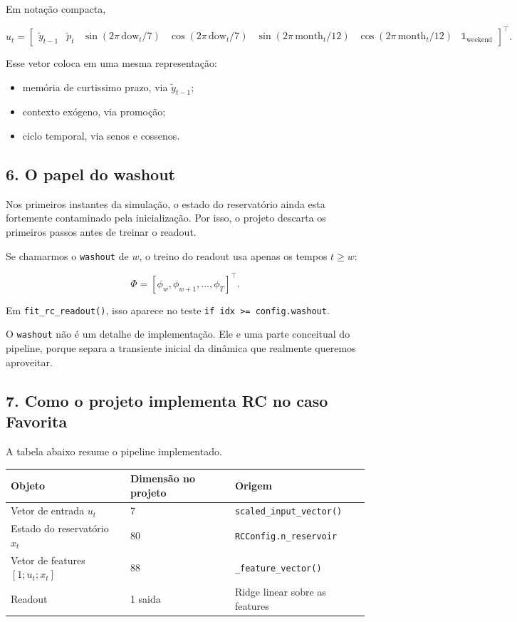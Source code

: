 \documentclass[12pt]{article}
\providecommand{\tightlist}{%
  \setlength{\itemsep}{0pt}\setlength{\parskip}{0pt}}
\begin{document}
Em notação compacta,

\[
u_t =
\begin{bmatrix}
\widetilde{y}_{t-1} &
\widetilde{p}_t &
\sin(2\pi \, \mathrm{dow}_t / 7) &
\cos(2\pi \, \mathrm{dow}_t / 7) &
\sin(2\pi \, \mathrm{month}_t / 12) &
\cos(2\pi \, \mathrm{month}_t / 12) &
\mathbb{1}_{\mathrm{weekend}}
\end{bmatrix}^\top.
\]

Esse vetor coloca em uma mesma representação:

\begin{itemize}
\tightlist
\item
  memória de curtissimo prazo, via \(\widetilde{y}_{t-1}\);
\item
  contexto exógeno, via promoção;
\item
  ciclo temporal, via senos e cossenos.
\end{itemize}

\subsection{6. O papel do washout}\label{6-o-papel-do-washout}

Nos primeiros instantes da simulação, o estado do reservatório ainda esta fortemente contaminado pela inicialização. Por isso, o projeto descarta os primeiros passos antes de treinar o readout.

Se chamarmos o \texttt{washout} de \(w\), o treino do readout usa apenas os tempos \(t \ge w\):

\[
\Phi = [\phi_w, \phi_{w+1}, \dots, \phi_T]^\top.
\]

Em \texttt{fit\_rc\_readout()}, isso aparece no teste \texttt{if\ idx\ \textgreater{}=\ config.washout}.

O \texttt{washout} não é um detalhe de implementação. Ele e uma parte conceitual do pipeline, porque separa a transiente inicial da dinâmica que realmente queremos aproveitar.

\subsection{7. Como o projeto implementa RC no caso Favorita}\label{7-como-o-projeto-implementa-rc-no-caso-favorita}

A tabela abaixo resume o pipeline implementado.

\begin{longtable}[]{@{}lll@{}}
\toprule\noalign{}
Objeto & Dimensão no projeto & Origem \\
\midrule\noalign{}
\endhead
\bottomrule\noalign{}
\endlastfoot
Vetor de entrada \(u_t\) & 7 & \texttt{scaled\_input\_vector()} \\
Estado do reservatório \(x_t\) & 80 & \texttt{RCConfig.n\_reservoir} \\
Vetor de features \([1; u_t; x_t]\) & 88 & \texttt{\_feature\_vector()} \\
Readout & 1 saida & Ridge linear sobre as features \\
\end{longtable}
\end{document}
